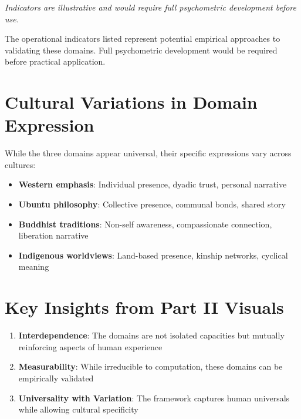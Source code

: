\documentclass[
  a4paper,
]{report}
\providecommand{\tightlist}{%
  \setlength{\itemsep}{0pt}\setlength{\parskip}{0pt}}
\begin{document}
\emph{Indicators are illustrative and would require full psychometric
development before use.}

\begin{tcolorbox}[enhanced jigsaw, toprule=.15mm, rightrule=.15mm, breakable, opacitybacktitle=0.6, colframe=quarto-callout-note-color-frame, colback=white, titlerule=0mm, arc=.35mm, leftrule=.75mm, opacityback=0, colbacktitle=quarto-callout-note-color!10!white, bottomrule=.15mm, coltitle=black, toptitle=1mm, bottomtitle=1mm, title=\textcolor{quarto-callout-note-color}{\faInfo}\hspace{0.5em}{Measurement Note}, left=2mm]

The operational indicators listed represent potential empirical
approaches to validating these domains. Full psychometric development
would be required before practical application.

\end{tcolorbox}

\section{Cultural Variations in Domain
Expression}\label{cultural-variations-in-domain-expression}

While the three domains appear universal, their specific expressions
vary across cultures:

\begin{itemize}
\tightlist
\item
  \textbf{Western emphasis}: Individual presence, dyadic trust, personal
  narrative
\item
  \textbf{Ubuntu philosophy}: Collective presence, communal bonds,
  shared story
\item
  \textbf{Buddhist traditions}: Non-self awareness, compassionate
  connection, liberation narrative
\item
  \textbf{Indigenous worldviews}: Land-based presence, kinship networks,
  cyclical meaning
\end{itemize}

\section{Key Insights from Part II
Visuals}\label{key-insights-from-part-ii-visuals}

\begin{enumerate}
\def\labelenumi{\arabic{enumi}.}
\tightlist
\item
  \textbf{Interdependence}: The domains are not isolated capacities but
  mutually reinforcing aspects of human experience
\item
  \textbf{Measurability}: While irreducible to computation, these
  domains can be empirically validated
\item
  \textbf{Universality with Variation}: The framework captures human
  universals while allowing cultural specificity
\end{enumerate}
\end{document}
